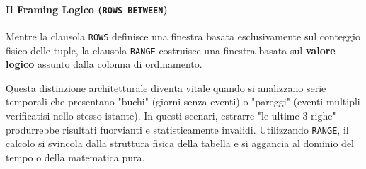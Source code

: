 \paragraph{Il Framing Logico (\texttt{ROWS BETWEEN})}

Mentre la clausola \texttt{ROWS} definisce una finestra basata esclusivamente sul conteggio fisico delle tuple, la clausola \texttt{RANGE} costruisce una finestra basata sul \textbf{valore logico} assunto dalla colonna di ordinamento.

Questa distinzione architetturale diventa vitale quando si analizzano serie temporali che presentano "buchi" (giorni senza eventi) o "pareggi" (eventi multipli verificatisi nello stesso istante). In questi scenari, estrarre "le ultime 3 righe" produrrebbe risultati fuorvianti e statisticamente invalidi. Utilizzando \texttt{RANGE}, il calcolo si svincola dalla struttura fisica della tabella e si aggancia al dominio del tempo o della matematica pura.

